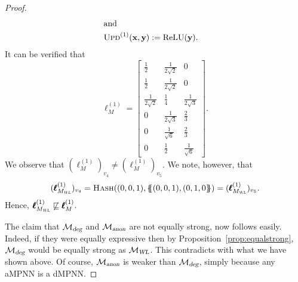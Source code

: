 \begin{proof}
\begin{align*}
\intertext{and} \textsc{Upd}^{(1)}(\mathbf{x},\mathbf{y})&:=\text{ReLU}(\mathbf{y}).
\end{align*}
It can be verified that 
$$
\pmb{\ell}_M^{(1)}=\begin{bmatrix}
\frac{1}{2} & \frac{1}{2\sqrt{2}}& 0\\
\frac{1}{2} & \frac{1}{2\sqrt{2}}& 0\\
\frac{1}{2\sqrt{2}} & \frac{1}{4}& \frac{1}{
2\sqrt{3}}\\
0 & \frac{1}{2\sqrt{3}}& \frac{2}{
3}\\
0 & \frac{1}{\sqrt{6}}& \frac{2}{
3}\\
0 & \frac{1}{2}& \frac{1}{
\sqrt{6}}
\end{bmatrix}.
$$
We observe that 
$(\pmb{\ell}_M^{(1)})_{v_4}\neq (\pmb{\ell}_M^{(1)})_{v_5}$. 
We note, however, that $$
(\pmb{\ell}_{M_\textsl{WL}}^{(1)})_{v_4}=\textsc{Hash}((0,0,1),\{\!\!\{(0,0,1),(0,1,0\}\!\!\})=(\pmb{\ell}_{M_\textsl{WL}}^{(1)})_{v_5}.$$
Hence, 
$\pmb{\ell}_{M_{\textsl{WL}}}^{(1)}\not\sqsubseteq \pmb{\ell}_M^{(1)}$.

The claim that $\mathcal{M}_{\textsl{deg}}$ and  $\mathcal{M}_{\textsl{anon}}$ are not equally strong, now follows easily. Indeed, if they were equally expressive
then by Proposition~\ref{prop:equalstrong}, $\mathcal{M}_{\textsl{deg}}$ would be equally strong as
$\mathcal{M}_{\textsl{WL}}$. This contradicts with what we have shown above. Of course, $\mathcal{M}_{\textsl{anon}}$ is weaker than $\mathcal{M}_{\textsl{deg}}$, simply because any aMPNN is a dMPNN.
\end{proof}


